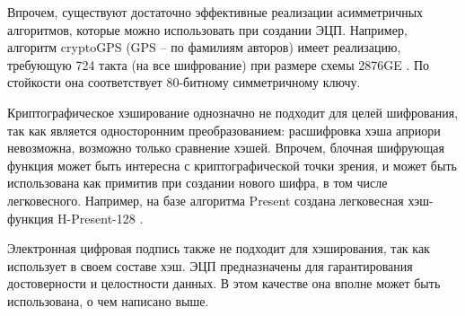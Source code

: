 Впрочем, существуют достаточно эффективные реализации асимметричных алгоритмов, которые можно использовать при создании ЭЦП. Например, алгоритм cryptoGPS (GPS – по фамилиям авторов) имеет реализацию, требующую 724 такта (на все шифрование) при размере схемы 2876GE \cite{src51}. По стойкости она соответствует 80-битному симметричному ключу.

Криптографическое хэширование однозначно не подходит для целей шифрования, так как является односторонним преобразованием: расшифровка хэша априори невозможна, возможно только сравнение хэшей. Впрочем, блочная шифрующая функция может быть интересна с криптографической точки зрения, и может быть использована как примитив при создании нового шифра, в том числе легковесного. Например, на базе алгоритма Present создана легковесная хэш-функция H-Present-128 \cite{src52}.

Электронная цифровая подпись также не подходит для хэширования, так как использует в своем составе хэш. ЭЦП предназначены для гарантирования достоверности и целостности данных. В этом качестве она вполне может быть использована, о чем написано выше.

\newpage

%
